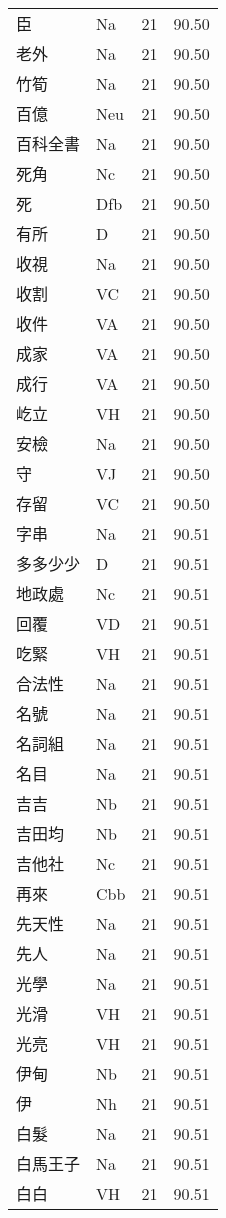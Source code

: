 \documentclass[twocolumn]{book}
\begin{document}
\begin{supertabular}{llrr}
臣 & Na & 21 &  90.50\\
老外 & Na & 21 &  90.50\\
竹筍 & Na & 21 &  90.50\\
百億 & Neu & 21 &  90.50\\
百科全書 & Na & 21 &  90.50\\
死角 & Nc & 21 &  90.50\\
死 & Dfb & 21 &  90.50\\
有所 & D & 21 &  90.50\\
收視 & Na & 21 &  90.50\\
收割 & VC & 21 &  90.50\\
收件 & VA & 21 &  90.50\\
成家 & VA & 21 &  90.50\\
成行 & VA & 21 &  90.50\\
屹立 & VH & 21 &  90.50\\
安檢 & Na & 21 &  90.50\\
守 & VJ & 21 &  90.50\\
存留 & VC & 21 &  90.50\\
字串 & Na & 21 &  90.51\\
多多少少 & D & 21 &  90.51\\
地政處 & Nc & 21 &  90.51\\
回覆 & VD & 21 &  90.51\\
吃緊 & VH & 21 &  90.51\\
合法性 & Na & 21 &  90.51\\
名號 & Na & 21 &  90.51\\
名詞組 & Na & 21 &  90.51\\
名目 & Na & 21 &  90.51\\
吉吉 & Nb & 21 &  90.51\\
吉田均 & Nb & 21 &  90.51\\
吉他社 & Nc & 21 &  90.51\\
再來 & Cbb & 21 &  90.51\\
先天性 & Na & 21 &  90.51\\
先人 & Na & 21 &  90.51\\
光學 & Na & 21 &  90.51\\
光滑 & VH & 21 &  90.51\\
光亮 & VH & 21 &  90.51\\
伊甸 & Nb & 21 &  90.51\\
伊 & Nh & 21 &  90.51\\
白髮 & Na & 21 &  90.51\\
白馬王子 & Na & 21 &  90.51\\
白白 & VH & 21 &  90.51\\

\end{supertabular}
\end{document}
